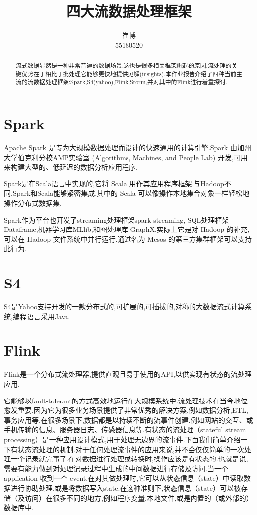 \documentclass[lang=cn,11pt,a4paper,cite=authoryear]{elegantpaper}
\title{四大流数据处理框架}
\author{崔\quad{}博\\55180520}
\date{\zhtoday}
\begin{document}
\maketitle

\begin{abstract}
流式数据显然是一种非常普遍的数据场景,这也是很多相关框架崛起的原因.流处理的关键优势在于相比于批处理它能够更快地提供见解(insights).本作业报告介绍了四种当前主流的流数据处理框架:Spark,S4(yahoo),Flink,Storm,并对其中的Flink进行着重探讨.
\end{abstract}
\section{Spark}
Apache Spark 是专为大规模数据处理而设计的快速通用的计算引擎.Spark 由加州大学伯克利分校AMP实验室 (Algorithms, Machines, and People Lab) 开发,可用来构建大型的、低延迟的数据分析应用程序.


Spark是在Scala语言中实现的,它将 Scala 用作其应用程序框架.与Hadoop不同,Spark和Scala能够紧密集成,其中的 Scala 可以像操作本地集合对象一样轻松地操作分布式数据集.

Spark作为平台也开发了streaming处理框架spark streaming, SQL处理框架Dataframe,机器学习库MLlib,和图处理库 GraphX.实际上它是对 Hadoop 的补充,可以在 Hadoop 文件系统中并行运行.通过名为 Mesos 的第三方集群框架可以支持此行为.

\section{S4}
S4是Yahoo支持开发的一款分布式的,可扩展的,可插拔的,对称的大数据流式计算系统,编程语言采用Java.

\section{Flink}
Flink是一个分布式流处理器,提供直观且易于使用的API,以供实现有状态的流处理应用.

它能够以fault-tolerant的方式高效地运行在大规模系统中.流处理技术在当今地位愈发重要,因为它为很多业务场景提供了非常优秀的解决方案,例如数据分析,ETL,事务应用等.在很多场景下,数据都是以持续不断的流事件创建.例如网站的交互、或手机传输的信息、服务器日志、传感器信息等.有状态的流处理（stateful stream processing）是一种应用设计模式,用于处理无边界的流事件.下面我们简单介绍一下有状态流处理的机制.对于任何处理流事件的应用来说,并不会仅仅简单的一次处理一个记录就完事了.在对数据进行处理或转换时,操作应该是有状态的.也就是说,需要有能力做到对处理记录过程中生成的中间数据进行存储及访问.当一个application 收到一个 event,在对其做处理时,它可以从状态信息（state）中读取数据进行协助处理.或是将数据写入state.在这种准则下,状态信息（state）可以被存储（及访问）在很多不同的地方,例如程序变量,本地文件,或是内置的（或外部的）数据库中.
\end{document}
